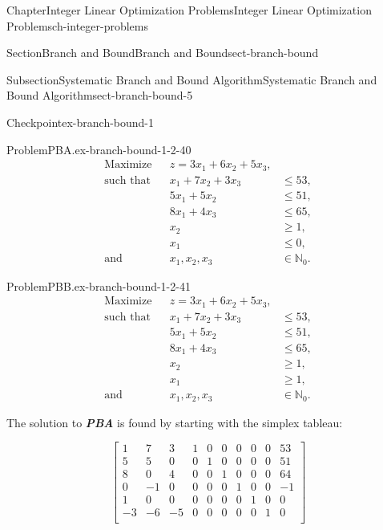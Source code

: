 \documentclass[oneside,10pt,]{book}
\newcommand{\alert}[1]{\textbf{\textit{#1}}}
\numberwithin{equation}{section}
\newcommand{\amp}{&}
\begin{document}
\begin{chapterptx}{Chapter}{Integer Linear Optimization Problems}{}{Integer Linear Optimization Problems}{}{}{ch-integer-problems}
\begin{sectionptx}{Section}{Branch and Bound}{}{Branch and Bound}{}{}{sect-branch-bound}
\begin{subsectionptx}{Subsection}{Systematic Branch and Bound Algorithm}{}{Systematic Branch and Bound Algorithm}{}{}{sect-branch-bound-5}
\begin{inlineexercise}{Checkpoint}{}{ex-branch-bound-1}
\begin{problem}{Problem}{PBA.}{ex-branch-bound-1-2-40}
\begin{equation*}
\begin{aligned} \text{Maximize} \amp\amp z = 3x_1 +6x_2 + 5 x_3, \amp\\ \text{such that} \amp\amp x_1 + 7 x_2 + 3x_3 \amp \leq 53, \\ \amp\amp 5 x_1 + 5 x_2 \amp \leq 51, \\ \amp\amp 8 x_1 + 4x_3 \amp \leq 65, \\ \amp\amp x_2 \amp \geq 1, \\ \amp\amp x_1 \amp \leq 0, \\ \text{and} \amp\amp x_1, x_2, x_3 \amp \in \mathbb{N}_{0}.
\end{aligned}
\end{equation*}
%
\end{problem}
\begin{problem}{Problem}{PBB.}{ex-branch-bound-1-2-41}%
%
\begin{equation*}
\begin{aligned} \text{Maximize} \amp\amp z = 3x_1 +6x_2 + 5 x_3, \amp\\ \text{such that} \amp\amp x_1 + 7 x_2 + 3x_3 \amp \leq 53, \\ \amp\amp 5 x_1 + 5 x_2 \amp \leq 51, \\ \amp\amp 8 x_1 + 4x_3 \amp \leq 65, \\ \amp\amp x_2 \amp \geq 1, \\ \amp\amp x_1 \amp \geq 1, \\ \text{and} \amp\amp x_1, x_2, x_3 \amp \in \mathbb{N}_{0}.
\end{aligned}
\end{equation*}
%
\end{problem}
The solution to \alert{PBA} is found by starting with the simplex tableau:%
\par
%
\begin{equation*}
\left[\begin{array}{rrr|rrrrrr|r} 1 \amp 7 \amp 3 \amp 1 \amp 0 \amp 0 \amp 0 \amp 0 \amp 0 \amp 53\\ 5 \amp 5 \amp 0 \amp 0 \amp 1 \amp 0 \amp 0 \amp 0 \amp 0 \amp 51\\ 8 \amp 0 \amp 4 \amp 0 \amp 0 \amp 1 \amp 0 \amp 0 \amp 0 \amp 64\\ 0 \amp -1 \amp 0 \amp 0 \amp 0 \amp 0 \amp 1 \amp 0 \amp 0 \amp -1\\ 1 \amp 0 \amp 0 \amp 0 \amp 0 \amp 0 \amp 0 \amp 1 \amp 0 \amp 0\\ \hline -3 \amp -6 \amp -5 \amp 0 \amp 0 \amp 0 \amp 0 \amp 0 \amp 1 \amp 0\\ \end{array} \right]

\end{equation*}
\end{inlineexercise}
\end{subsectionptx}
\end{sectionptx}
\end{chapterptx}
\end{document}
